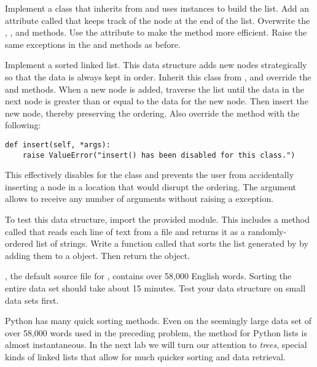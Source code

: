 \begin{problem}
Implement a  class that inherits from  and uses  instances to build the list.
Add an attribute called  that keeps track of the node at the end of the list.
Overwrite the , , and  methods.
Use the  attribute to make the  method more efficient.
Raise the same exceptions in the  and  methods as before.
\end{problem}

\begin{problem}
Implement a sorted linked list.
This data structure adds new nodes strategically so that the data is always kept in order.
Inherit this class from , and override the  and  methods.
When a new node is added, traverse the list until the data in the next node is greater than or equal to the data for the new node.
Then insert the new node, thereby preserving the ordering.
Also override the  method with the following:

\begin{lstlisting}
def insert(self, *args):
	raise ValueError("insert() has been disabled for this class.")
\end{lstlisting}

This effectively disables  for the  class and prevents the user from accidentally inserting a node in a location that would disrupt the ordering.
The  argument allows  to receive any number of arguments without raising a  exception.

To test this data structure, import the provided  module.
This includes a method called  that reads each line of text from a file and returns it as a randomly-ordered list of strings.
Write a function called  that sorts the list generated by  by adding them to a  object.
Then return the object.

\begin{warn}
, the default source file for , contains over 58,000 English words.
Sorting the entire data set should take about 15 minutes.
Test your data structure on small data sets first.
\end{warn}
\end{problem}

Python has many quick sorting methods.
Even on the seemingly large data set of over 58,000 words used in the preceding problem, the  method for Python lists is almost instantaneous.
In the next lab we will turn our attention to \emph{trees}, special kinds of linked lists that allow for much quicker sorting and data retrieval.

